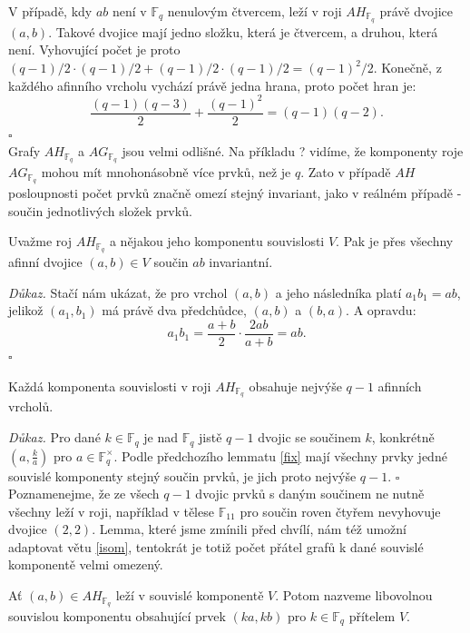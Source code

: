 \documentclass[12pt]{report}
\begin{document}
V případě, kdy $ab$ není v $\mathbb{F}_q$ nenulovým čtvercem, leží v roji $AH_{\mathbb{F}_q}$ právě dvojice $(a,b)$. Takové dvojice mají jedno složku, která je čtvercem, a druhou, která není. Vyhovující počet je proto $(q-1)/2 \cdot (q-1)/2 + (q-1)/2 \cdot (q-1)/2 = (q-1)^2/2$. Konečně, z každého afinního vrcholu vychází právě jedna hrana, proto počet hran je:
$$\frac{(q-1)(q-3)}{2}+\frac{(q-1)^2}{2} = (q-1)(q-2).$$  \hfill $\square$\\



Grafy $AH_{\mathbb{F}_q}$ a $AG_{\mathbb{F}_q}$ jsou velmi odlišné. Na příkladu ? vidíme, že komponenty roje $AG_{\mathbb{F}_q}$ mohou mít mnohonásobně více prvků, než je $q$. Zato v případě $AH$ posloupnosti počet prvků značně omezí stejný invariant, jako v reálném případě - součin jednotlivých složek prvků. 

\begin{lemma}\label{fix}
Uvažme roj $AH_{\mathbb{F}_q}$ a nějakou jeho komponentu souvislosti $V$. Pak je přes všechny afinní dvojice $(a,b) \in V$ součin $ab$ invariantní.
\end{lemma}
\noindent \textit{Důkaz.} Stačí nám ukázat, že pro vrchol $(a,b)$ a jeho následníka platí $a_1 b_1 = ab$, jelikož $(a_1,b_1)$ má právě dva předchůdce, $(a,b)$ a $(b,a)$. A opravdu:
\begin{equation*}
a_1 b_1 = \frac{a+b}{2} \cdot \frac{2ab}{a+b} = ab.
\end{equation*} 
\hfill $\square$\\

\begin{dusledek}\label{fixab}
Každá komponenta souvislosti v roji $AH_{\mathbb{F}_q}$ obsahuje nejvýše $q-1$ afinních vrcholů.
\end{dusledek}
\noindent \textit{Důkaz.} Pro dané $k \in \mathbb{F}_q$ je nad $\mathbb{F}_q$ jistě $q-1$ dvojic se součinem $k$, konkrétně $\left(a, \frac{k}{a}\right)$ pro $a \in \mathbb{F}_q ^{\times}$. Podle předchozího lemmatu \ref{fix} mají všechny prvky jedné souvislé komponenty stejný součin prvků, je jich proto nejvýše $q-1$. \hfill $\square$\\

Poznamenejme, že ze všech $q-1$ dvojic prvků s daným součinem ne nutně všechny leží v roji, například v tělese $\mathbb{F}_{11}$ pro součin roven čtyřem nevyhovuje dvojice $(2,2)$. Lemma, které jsme zmínili před chvílí, nám též umožní adaptovat větu \ref{isom}, tentokrát je totiž počet přátel grafů k dané souvislé komponentě velmi omezený.
\begin{definice}
Ať $(a,b) \in AH_{\mathbb{F}_q}$ leží v souvislé komponentě $V$. Potom nazveme libovolnou souvislou komponentu obsahující prvek $(ka,kb)$ pro $k \in \mathbb{F}_q$ přítelem $V$.
\end{definice}
\end{document}
